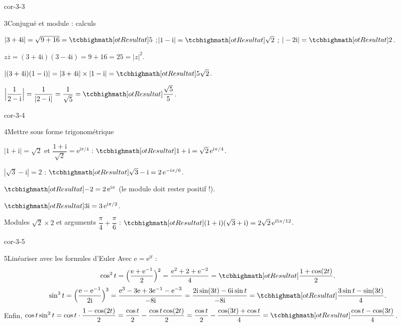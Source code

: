 \begin{blocLivre}{cor-3-3}
\begin{corrige}{3}{Conjugué et module : calculs}
\begin{questions}
  \item $|3+4\mathrm{i}|=\sqrt{9+16}=\res{5}$ ;\quad $|1-\mathrm{i}|=\res{\sqrt2}$ ;\quad
    $|-2\mathrm{i}|=\res{2}$.
  \item $z\overline{z}=(3+4\mathrm{i})(3-4\mathrm{i})=9+16=25=|z|^{2}$.
  \item $|(3+4\mathrm{i})(1-\mathrm{i})|=|3+4\mathrm{i}|\times|1-\mathrm{i}|=\res{5\sqrt2}$.
  \item $\Bigl|\dfrac{1}{2-\mathrm{i}}\Bigr|=\dfrac{1}{|2-\mathrm{i}|}=\dfrac{1}{\sqrt5}
    =\res{\dfrac{\sqrt5}{5}}$.
\end{questions}
\end{corrige}
\end{blocLivre}

\begin{blocLivre}{cor-3-4}
\begin{corrige}{4}{Mettre sous forme trigonométrique}
\begin{questions}
  \item $|1+\mathrm{i}|=\sqrt2$ et $\dfrac{1+\mathrm{i}}{\sqrt2}=\mathrm{e}^{\mathrm{i}\pi/4}$ :
    $\res{1+\mathrm{i}=\sqrt2\,\mathrm{e}^{\mathrm{i}\pi/4}}$.
  \item $|\sqrt3-\mathrm{i}|=2$ : $\res{\sqrt3-\mathrm{i}=2\,\mathrm{e}^{-\mathrm{i}\pi/6}}$.
  \item $\res{-2=2\,\mathrm{e}^{\mathrm{i}\pi}}$ (le module doit rester positif !).
  \item $\res{3\mathrm{i}=3\,\mathrm{e}^{\mathrm{i}\pi/2}}$.
  \item Modules $\sqrt2\times2$ et arguments $\dfrac{\pi}{4}+\dfrac{\pi}{6}$ :
    $\res{(1+\mathrm{i})(\sqrt3+\mathrm{i})=2\sqrt2\,\mathrm{e}^{\mathrm{i}5\pi/12}}$.
\end{questions}
\end{corrige}
\end{blocLivre}

\begin{blocLivre}{cor-3-5}
\begin{corrige}{5}{Linéariser avec les formules d'Euler}
Avec $\mathrm{e}=\mathrm{e}^{\mathrm{i}t}$ :
\[
  \cos^{2}t=\Bigl(\frac{\mathrm{e}+\mathrm{e}^{-1}}{2}\Bigr)^{2}
  =\frac{\mathrm{e}^{2}+2+\mathrm{e}^{-2}}{4}
  =\res{\frac{1+\cos(2t)}{2}}.
\]
\[
  \sin^{3}t=\Bigl(\frac{\mathrm{e}-\mathrm{e}^{-1}}{2\mathrm{i}}\Bigr)^{3}
  =\frac{\mathrm{e}^{3}-3\mathrm{e}+3\mathrm{e}^{-1}-\mathrm{e}^{-3}}{-8\mathrm{i}}
  =\frac{2\mathrm{i}\sin(3t)-6\mathrm{i}\sin t}{-8\mathrm{i}}
  =\res{\frac{3\sin t-\sin(3t)}{4}}.
\]
Enfin, $\cos t\sin^{2}t=\cos t\cdot\dfrac{1-\cos(2t)}{2}
=\dfrac{\cos t}{2}-\dfrac{\cos t\cos(2t)}{2}
=\dfrac{\cos t}{2}-\dfrac{\cos(3t)+\cos t}{4}
=\res{\dfrac{\cos t-\cos(3t)}{4}}$.
\end{corrige}
\end{blocLivre}


